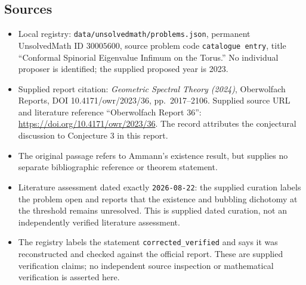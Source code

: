 \documentclass[11pt]{article}
\begin{document}
\subsection{Sources}
\begin{itemize}
\item Local registry: \texttt{data/unsolvedmath/problems.json}, permanent UnsolvedMath ID \(30005600\), source problem code \texttt{catalogue entry}, title ``Conformal Spinorial Eigenvalue Infimum on the Torus.'' No individual proposer is identified; the supplied proposed year is 2023.
\item Supplied report citation: \emph{Geometric Spectral Theory (2024)}, Oberwolfach Reports, DOI 10.4171/owr/2023/36, pp.~2017--2106. Supplied source URL and literature reference ``Oberwolfach Report 36'': \url{https://doi.org/10.4171/owr/2023/36}. The record attributes the conjectural discussion to Conjecture 3 in this report.
\item The original passage refers to Ammann's existence result, but supplies no separate bibliographic reference or theorem statement.
\item Literature assessment dated exactly \texttt{2026-08-22}: the supplied curation labels the problem open and reports that the existence and bubbling dichotomy at the threshold remains unresolved. This is supplied dated curation, not an independently verified literature assessment.
\item The registry labels the statement \texttt{corrected\_verified} and says it was reconstructed and checked against the official report. These are supplied verification claims; no independent source inspection or mathematical verification is asserted here.
\end{itemize}
\end{document}
